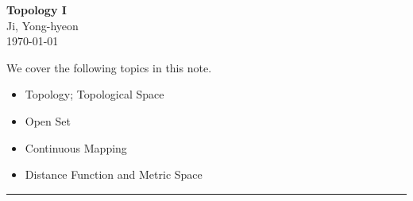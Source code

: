 \documentclass[11pt,openany]{article}
\begin{document}
\begin{center}
	\huge\textbf{Topology I}\\
	\vspace{0.5em}
	\large{Ji, Yong-hyeon}\\
	\vspace{0.5em}
	\normalsize{\today}\\
\end{center}

\noindent 
We cover the following topics in this note.
\begin{itemize}
	\item Topology; Topological Space
	\item Open Set
	\item Continuous Mapping
	\item Distance Function and Metric Space
\end{itemize}
\hrule\vspace{12pt}
\end{document}
